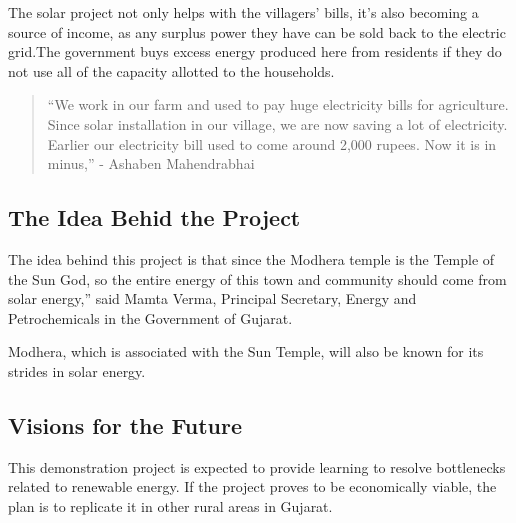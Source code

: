 \documentclass[11pt]{article}
\begin{document}
The solar project not only helps with the villagers’ bills, it’s also becoming a source of income, as any surplus power they have can be sold back to the electric grid.The government buys excess energy produced here from residents if they do not use all of the capacity allotted to the households.


\begin{quote}
“We work in our farm and used to pay huge electricity bills for agriculture. Since solar installation in our village, we are now saving a lot of electricity. Earlier our electricity bill used to come around 2,000 rupees. Now it is in minus,” - Ashaben Mahendrabhai
\end{quote}

\subsection{The Idea Behid the Project}
\label{sec:orgedd0a12}
The idea behind this project is that since the Modhera temple is the Temple of the Sun God, so the entire energy of this town and community should come from solar energy,” said Mamta Verma, Principal Secretary, Energy and Petrochemicals in the Government of Gujarat.

\begin{center}
Modhera, which is associated with the Sun Temple, will also be known for its strides in solar energy.
\end{center}

\subsection{Visions for the Future}
\label{sec:orgaff2d9d}

This demonstration project is expected to provide learning to resolve bottlenecks related to renewable energy. If the project proves to be economically viable, the plan is to replicate it in other rural areas in Gujarat.
\end{document}

